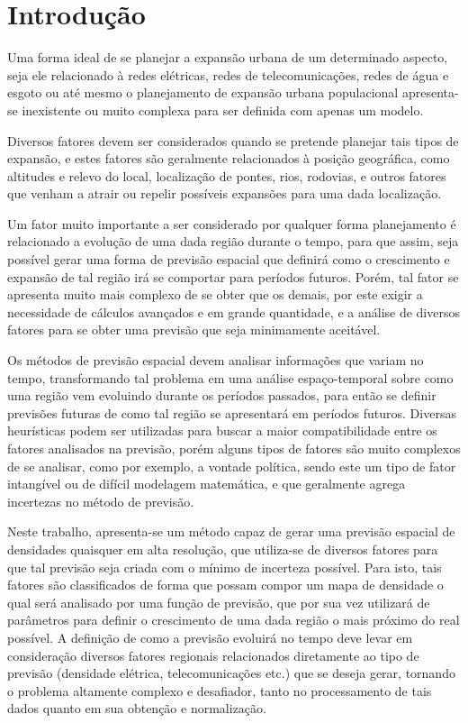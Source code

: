 \chapter{Introdução}
\label{introducao}

Uma forma ideal de se planejar a expansão urbana de um determinado aspecto, seja ele relacionado à redes elétricas, redes de telecomunicações, redes de água e esgoto ou até mesmo o planejamento de expansão urbana populacional apresenta-se inexistente ou muito complexa para ser definida com apenas um modelo. 

Diversos fatores devem ser considerados quando se pretende planejar tais tipos de expansão, e estes fatores são geralmente relacionados à posição geográfica, como altitudes e relevo do local, localização de pontes, rios, rodovias, e outros fatores que venham a atrair ou repelir possíveis expansões para uma dada localização.

Um fator muito importante a ser considerado por qualquer forma planejamento é relacionado a evolução de uma dada região durante o tempo, para que assim, seja possível gerar uma forma de previsão espacial que definirá como o crescimento e expansão de tal região irá se comportar para períodos futuros. Porém, tal fator se apresenta muito mais complexo de se obter que os demais, por este exigir a necessidade de cálculos avançados e em grande quantidade, e a análise de diversos fatores para se obter uma previsão que seja minimamente aceitável. 

Os métodos de previsão espacial devem analisar informações que variam no tempo, transformando tal problema em uma análise espaço-temporal sobre como uma região vem evoluindo durante os períodos passados, para então se definir previsões futuras de como tal região se apresentará em períodos futuros. Diversas heurísticas podem ser utilizadas para buscar a maior compatibilidade entre os fatores analisados na previsão, porém alguns tipos de fatores são muito complexos de se analisar, como por exemplo, a vontade política, sendo este um tipo de fator intangível ou de difícil modelagem matemática, e que geralmente agrega incertezas no método de previsão.

Neste trabalho, apresenta-se um método capaz de gerar uma previsão espacial de densidades quaisquer em alta resolução, que utiliza-se de diversos fatores para que tal previsão seja criada com o mínimo de incerteza possível. Para isto, tais fatores são classificados de forma que possam compor um mapa de densidade o qual será analisado por uma função de previsão, que por sua vez utilizará de parâmetros para definir o crescimento de uma dada região o mais próximo do real possível. A definição de como a previsão evoluirá no tempo deve levar em consideração diversos fatores regionais relacionados diretamente ao tipo de previsão (densidade elétrica, telecomunicações etc.) que se deseja gerar, tornando o problema altamente complexo e desafiador, tanto no processamento de tais dados quanto em sua obtenção e normalização. 

